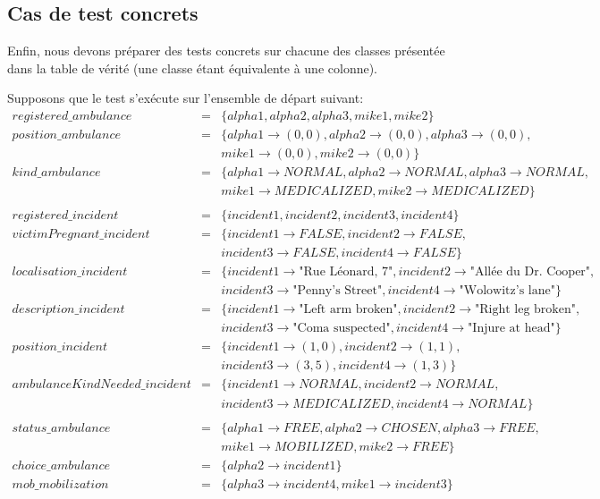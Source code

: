 \documentclass{report}
\begin{document}
\subsection{Cas de test concrets}

Enfin, nous devons préparer des tests concrets sur chacune des classes 
présentée dans la table de vérité (une classe étant équivalente à une
colonne).

Supposons que le test s'exécute sur l'ensemble de départ suivant:
\begin{eqnarray*}
registered\_ambulance &=& \{alpha1, alpha2, alpha3, mike1, mike2\}\\
position\_ambulance &=& \{alpha1 \rightarrow (0,0), alpha2 \rightarrow (0,0), alpha3 \rightarrow (0,0), \\ 
	&& mike1 \rightarrow (0,0), mike2 \rightarrow (0,0)\}\\
kind\_ambulance &=& \{alpha1 \rightarrow NORMAL, alpha2 \rightarrow NORMAL, alpha3 \rightarrow NORMAL, \\ 
	&& mike1 \rightarrow MEDICALIZED, mike2 \rightarrow MEDICALIZED\} \\
\\
registered\_incident &=& \{incident1, incident2, incident3, incident4\}\\
victimPregnant\_incident &=& \{incident1 \rightarrow FALSE, incident2\rightarrow FALSE, \\ 
	&& incident3\rightarrow FALSE, incident4\rightarrow FALSE\}\\
localisation\_incident &=& \{incident1 \rightarrow \text{"Rue Léonard, 7"}, incident2 \rightarrow \text{"Allée du Dr. Cooper"},\\ 
	&&  incident3  \rightarrow \text{"Penny's Street"}, incident4 \rightarrow \text{"Wolowitz's lane"}\}\\
description\_incident &=& \{incident1 \rightarrow \text{"Left arm broken"}, incident2 \rightarrow \text{"Right leg broken"},\\ 
	&&  incident3 \rightarrow \text{"Coma suspected"}, incident4 \rightarrow \text{"Injure at head"}\}\\
position\_incident &=& \{incident1 \rightarrow (1,0), incident2 \rightarrow (1,1),\\ 
	&&  incident3 \rightarrow (3,5), incident4 \rightarrow (1,3)\}\\
ambulanceKindNeeded\_incident &=& \{incident1 \rightarrow NORMAL, incident2 \rightarrow NORMAL, \\ 
	&& incident3 \rightarrow MEDICALIZED, incident4 \rightarrow NORMAL\}\\
\\
status\_ambulance &=& \{alpha1 \rightarrow FREE, alpha2 \rightarrow CHOSEN, alpha3 \rightarrow FREE, \\ 
	&& mike1 \rightarrow MOBILIZED, mike2 \rightarrow FREE\} \\
choice\_ambulance &=& \{alpha2 \rightarrow incident1\} \\
mob\_mobilization &=& \{alpha3 \rightarrow incident4, mike1 \rightarrow incident3\} \\
\end{eqnarray*}
\end{document}

